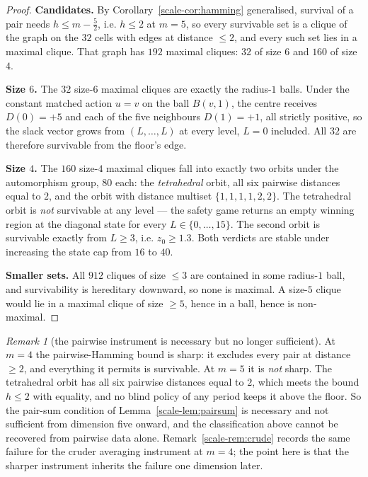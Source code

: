 \documentclass[10pt,twocolumn]{article}
\theoremstyle{plain}
\theoremstyle{definition}
\theoremstyle{remark}
\newtheorem{remark}[theorem]{Remark}
\begin{document}
\begin{proof}
\textbf{Candidates.} By Corollary~\ref{scale-cor:hamming} generalised, survival of a pair needs
\(h \le m - \tfrac52\), i.e. \(h \le 2\) at \(m = 5\), so every survivable set is a clique of
the graph on the \(32\) cells with edges at distance \(\le 2\), and every such set lies in a
maximal clique. That graph has \(192\) maximal cliques: \(32\) of size \(6\) and \(160\) of
size \(4\).

\textbf{Size \(6\).} The \(32\) size-\(6\) maximal cliques are exactly the radius-\(1\) balls.
Under the constant matched action \(u = v\) on the ball \(B(v,1)\), the centre receives
\(D(0) = +5\) and each of the five neighbours \(D(1) = +1\), all strictly positive, so the
slack vector grows from \((L,\dots,L)\) at every level, \(L = 0\) included. All \(32\) are
therefore survivable from the floor's edge.

\textbf{Size \(4\).} The \(160\) size-\(4\) maximal cliques fall into exactly two orbits under
the automorphism group, \(80\) each: the \emph{tetrahedral} orbit, all six pairwise
distances equal to \(2\), and the orbit with distance multiset \(\{1,1,1,1,2,2\}\). The
tetrahedral orbit is \emph{not} survivable at any level --- the safety game returns an empty
winning region at the diagonal state for every \(L \in \{0,\dots,15\}\). The second orbit is
survivable exactly from \(L \ge 3\), i.e. \(z_{0} \ge 1.3\). Both verdicts are stable under
increasing the state cap from \(16\) to \(40\).

\textbf{Smaller sets.} All \(912\) cliques of size \(\le 3\) are contained in some
radius-\(1\) ball, and survivability is hereditary downward, so none is maximal. A
size-\(5\) clique would lie in a maximal clique of size \(\ge 5\), hence in a ball, hence is
non-maximal.
\end{proof}

\begin{remark}[the pairwise instrument is necessary but no longer sufficient]
\label{scale-rem:notsuff}
At \(m = 4\) the pairwise-Hamming bound is sharp: it excludes every pair at distance
\(\ge 2\), and everything it permits is survivable. At \(m = 5\) it is \emph{not} sharp. The
tetrahedral orbit has all six pairwise distances equal to \(2\), which meets the bound
\(h \le 2\) with equality, and no blind policy of any period keeps it above the floor. So
the pair-sum condition of Lemma~\ref{scale-lem:pairsum} is necessary and not sufficient from
dimension five onward, and the classification above cannot be recovered from pairwise data
alone. Remark~\ref{scale-rem:crude} records the same failure for the cruder averaging instrument
at \(m = 4\); the point here is that the sharper instrument inherits the failure one
dimension later.
\end{remark}
\end{document}
